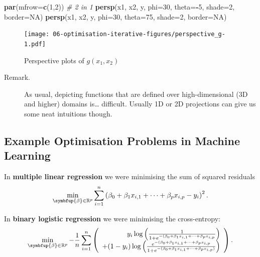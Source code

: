 \documentclass[10pt,b5paper,krantz1]{krantz}
\newenvironment{Shaded}{\begin{snugshade}}{\end{snugshade}}
\newcommand{\CommentTok}[1]{\textcolor[rgb]{0.37,0.37,0.37}{\textit{#1}}}
\newcommand{\DataTypeTok}[1]{\textcolor[rgb]{0.27,0.27,0.27}{#1}}
\newcommand{\DecValTok}[1]{\textcolor[rgb]{0.06,0.06,0.06}{#1}}
\newcommand{\KeywordTok}[1]{\textcolor[rgb]{0.27,0.27,0.27}{\textbf{#1}}}
\newcommand{\NormalTok}[1]{#1}
\newcommand{\OperatorTok}[1]{\textcolor[rgb]{0.43,0.43,0.43}{\textbf{#1}}}
\newcommand{\OtherTok}[1]{\textcolor[rgb]{0.37,0.37,0.37}{#1}}
\renewcommand{\boldsymbol}[1]{\symbfup{#1}}
\begin{document}
\begin{Shaded}
\begin{Highlighting}[]
\KeywordTok{par}\NormalTok{(}\DataTypeTok{mfrow=}\KeywordTok{c}\NormalTok{(}\DecValTok{1}\NormalTok{,}\DecValTok{2}\NormalTok{)) }\CommentTok{# 2 in 1}
\KeywordTok{persp}\NormalTok{(x1, x2, y, }\DataTypeTok{phi=}\DecValTok{30}\NormalTok{, }\DataTypeTok{theta=}\OperatorTok{-}\DecValTok{5}\NormalTok{, }\DataTypeTok{shade=}\DecValTok{2}\NormalTok{, }\DataTypeTok{border=}\OtherTok{NA}\NormalTok{)}
\KeywordTok{persp}\NormalTok{(x1, x2, y, }\DataTypeTok{phi=}\DecValTok{30}\NormalTok{, }\DataTypeTok{theta=}\DecValTok{75}\NormalTok{, }\DataTypeTok{shade=}\DecValTok{2}\NormalTok{, }\DataTypeTok{border=}\OtherTok{NA}\NormalTok{)}
\end{Highlighting}
\end{Shaded}

\begin{figure}
\hypertarget{fig:perspective_g}{%
\centering
\texttt{[image: 06-optimisation-iterative-figures/perspective\_g-1.pdf]}
\caption{Perspective plots of \(g(x_1,x_2)\)}\label{fig:perspective_g}
}
\end{figure}

\begin{description}
\item[Remark.]
As usual, depicting functions that are defined over
high-dimensional (3D and higher) domains
is\ldots{} difficult.
Usually 1D or 2D projections can give us some neat intuitions though.
\end{description}

\hypertarget{example-optimisation-problems-in-machine-learning}{%
\subsection{Example Optimisation Problems in Machine Learning}\label{example-optimisation-problems-in-machine-learning}}

In \textbf{multiple linear regression} we were minimising
the sum of squared residuals
\[
\min_{\boldsymbol\beta\in\mathbb{R}^p}
\sum_{i=1}^n \left( \beta_0 + \beta_1 x_{i,1}+\dots+\beta_p x_{i,p} - y_i \right)^2.
\]

In \textbf{binary logistic regression} we were minimising the cross-entropy:
\[
\min_{\boldsymbol\beta\in\mathbb{R}^p}
-\frac{1}{n} \sum_{i=1}^n
\left(\begin{array}{r}
     y_i \log \left(\frac{1}{1+e^{-(\beta_0 + \beta_1 x_{i,1}+\dots+\beta_p x_{i,p}}}                                                        \right)\\
+ (1-y_i)\log \left(\frac{e^{-(\beta_0 + \beta_1 x_{i,1}+\dots+\beta_p x_{i,p}}}{1+e^{-(\beta_0 + \beta_1 x_{i,1}+\dots+\beta_p x_{i,p})}}\right)
\end{array}\right).
\]
\end{document}
